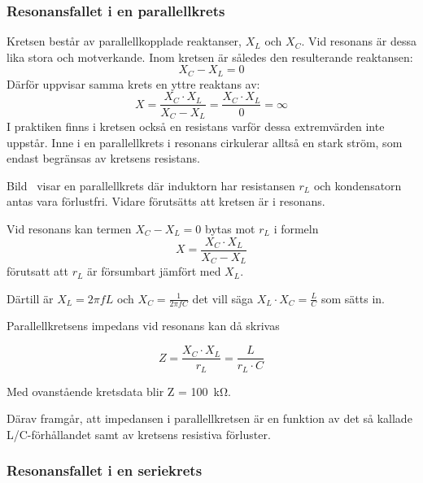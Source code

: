 \subsubsection{Resonansfallet i en parallellkrets}
\label{parallellresonans}


Kretsen består av parallellkopplade reaktanser, \(X_L\) och \(X_C\).
Vid resonans är dessa lika stora och motverkande.
Inom kretsen är således den resulterande reaktansen:
%
\[X_C - X_L = 0\]
%
Därför uppvisar samma krets en yttre reaktans av:
%
\[
  X = \frac{X_C \cdot X_L}{X_C - X_L}
  = \frac{X_C \cdot X_L}{0}
  = \infty
\]
%
I praktiken finns i kretsen också en resistans varför dessa extremvärden inte
uppstår.
Inne i en parallellkrets i resonans cirkulerar alltså en stark ström,
som endast begränsas av kretsens resistans.

Bild~ visar en parallellkrets där induktorn har
resistansen \(r_L\) och kondensatorn antas vara förlustfri.
Vidare förutsätts att kretsen är i resonans.

Vid resonans kan termen \(X_C - X_L = 0\) bytas mot \(r_L\) i formeln
\[X = \frac{X_C \cdot X_L}{X_C - X_L}\] förutsatt att \(r_L\) är försumbart
jämfört med \(X_L\).

Därtill är \(X_L = 2\pi fL\) och \(X_C = \frac{1}{2\pi fC}\) det vill säga
\(X_L \cdot X_C = \frac{L}{C}\) som sätts in.

Parallellkretsens impedans vid resonans kan då skrivas

\[
Z = \frac{X_C \cdot X_L}{r_L} = \frac{L}{r_L \cdot C}
\]

Med ovanstående kretsdata blir Z = \qty{100}{\kilo\ohm}.

Därav framgår, att impedansen i parallellkretsen är en funktion av det så
kallade L/C-förhållandet samt av kretsens resistiva förluster.


\subsubsection{Resonansfallet i en seriekrets}
\label{serieresonans}


